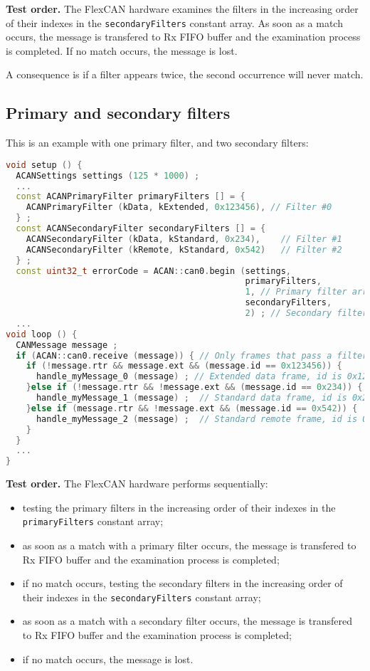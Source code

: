 \documentclass[9pt, a4paper, obeyspaces, openany]{extarticle}
\begin{document}
{\bf Test order.} The FlexCAN hardware examines the filters in the increasing order of their indexes in the \texttt{secondaryFilters} constant array. As soon as a match occurs, the message is transfered to Rx FIFO buffer and the examination process is completed. If no match occurs, the message is lost.

A consequence is if a filter appears twice, the second occurrence will never match.



\subsection{Primary and secondary filters}

This is an example with one primary filter, and two secondary filters:
{ \small\begin{lstlisting}[language=c++]
void setup () {
  ACANSettings settings (125 * 1000) ;
  ...
  const ACANPrimaryFilter primaryFilters [] = {
    ACANPrimaryFilter (kData, kExtended, 0x123456), // Filter #0
  } ;
  const ACANSecondaryFilter secondaryFilters [] = {
    ACANSecondaryFilter (kData, kStandard, 0x234),    // Filter #1
    ACANSecondaryFilter (kRemote, kStandard, 0x542)   // Filter #2
  } ;
  const uint32_t errorCode = ACAN::can0.begin (settings,
                                               primaryFilters, 
                                               1, // Primary filter array size
                                               secondaryFilters,
                                               2) ; // Secondary filter array size
  ...
void loop () {
  CANMessage message ;
  if (ACAN::can0.receive (message)) { // Only frames that pass a filter are retrieved
    if (!message.rtr && message.ext && (message.id == 0x123456)) {
      handle_myMessage_0 (message) ; // Extended data frame, id is 0x123456
    }else if (!message.rtr && !message.ext && (message.id == 0x234)) {
      handle_myMessage_1 (message) ;  // Standard data frame, id is 0x234
    }else if (message.rtr && !message.ext && (message.id == 0x542)) {
      handle_myMessage_2 (message) ;  // Standard remote frame, id is 0x542
    }
  }
  ...
}
\end{lstlisting}}


{\bf Test order.} The FlexCAN hardware performs sequentially:
\begin{itemize}
  \item testing the primary filters in the increasing order of their indexes in the \texttt{primaryFilters} constant array;
  \item as soon as a match with a primary filter occurs, the message is transfered to Rx FIFO buffer and the examination process is completed;
  \item if no match occurs, testing the secondary filters in the increasing order of their indexes in the \texttt{secondaryFilters} constant array;
  \item as soon as a match with a secondary filter occurs, the message is transfered to Rx FIFO buffer and the examination process is completed;
  \item if no match occurs, the message is lost.
\end{itemize}
\end{document}
